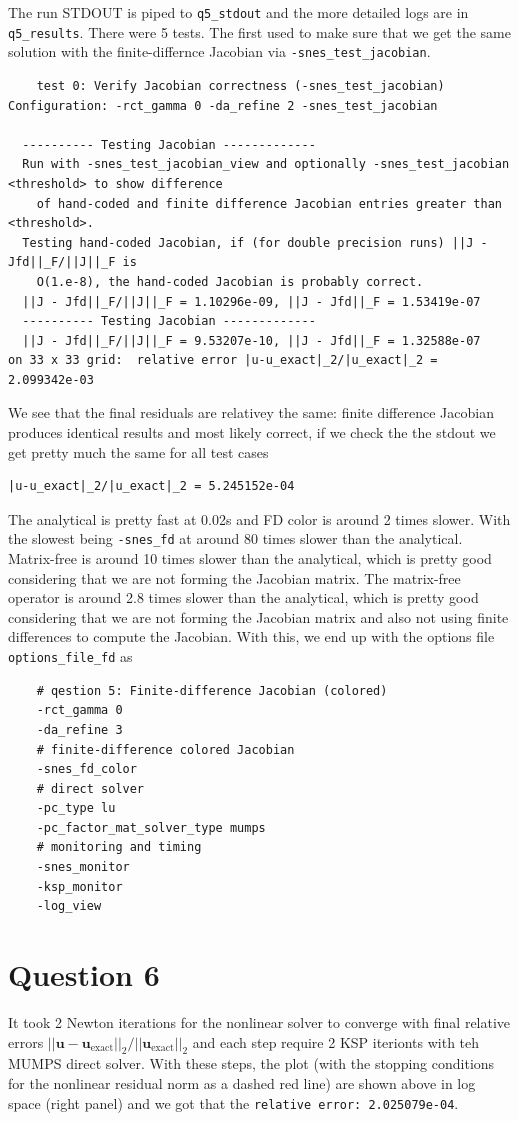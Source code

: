\documentclass[12pt]{article}
\begin{document}
The run STDOUT is piped to \texttt{q5\_stdout} and the more detailed logs are in \texttt{q5\_results}. There were 5 tests. The first used to make sure that we get the same solution with the finite-differnce Jacobian via \texttt{-snes\_test\_jacobian}. 
\begin{verbatim}
    test 0: Verify Jacobian correctness (-snes_test_jacobian)
Configuration: -rct_gamma 0 -da_refine 2 -snes_test_jacobian

  ---------- Testing Jacobian -------------
  Run with -snes_test_jacobian_view and optionally -snes_test_jacobian <threshold> to show difference
    of hand-coded and finite difference Jacobian entries greater than <threshold>.
  Testing hand-coded Jacobian, if (for double precision runs) ||J - Jfd||_F/||J||_F is
    O(1.e-8), the hand-coded Jacobian is probably correct.
  ||J - Jfd||_F/||J||_F = 1.10296e-09, ||J - Jfd||_F = 1.53419e-07
  ---------- Testing Jacobian -------------
  ||J - Jfd||_F/||J||_F = 9.53207e-10, ||J - Jfd||_F = 1.32588e-07
on 33 x 33 grid:  relative error |u-u_exact|_2/|u_exact|_2 = 2.099342e-03
\end{verbatim}
We see that the final residuals are relativey the same: finite difference Jacobian produces identical results and most likely correct, if we check the the stdout we get pretty much the same for all test cases
\begin{verbatim}
|u-u_exact|_2/|u_exact|_2 = 5.245152e-04
\end{verbatim}
The analytical is pretty fast at 0.02s and FD color is around 2 times slower. With the slowest being \texttt{-snes\_fd} at around 80 times slower than the analytical. Matrix-free is around 10 times slower than the analytical, which is pretty good considering that we are not forming the Jacobian matrix. The matrix-free operator is around 2.8 times slower than the analytical, which is pretty good considering that we are not forming the Jacobian matrix and also not using finite differences to compute the Jacobian.
With this, we end up with the options file \texttt{options\_file\_fd} as 
\begin{verbatim}
    # qestion 5: Finite-difference Jacobian (colored)
    -rct_gamma 0
    -da_refine 3
    # finite-difference colored Jacobian
    -snes_fd_color
    # direct solver
    -pc_type lu
    -pc_factor_mat_solver_type mumps
    # monitoring and timing
    -snes_monitor
    -ksp_monitor
    -log_view
\end{verbatim}

\section{Question 6}
It took 2 Newton iterations for the nonlinear solver to converge with final relative errors $||\mathbf{u} - \mathbf{u}_{\text{exact}}||_2 / ||\mathbf{u}_{\text{exact}}||_2$ and each step require 2 KSP iterionts with teh MUMPS direct solver. With these steps, the plot (with the stopping conditions for the nonlinear residual norm as a dashed red line) are shown above in log space (right panel) and we got that the \texttt{relative error: 2.025079e-04}.
\end{document}
